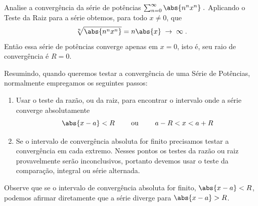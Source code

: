 \begin{example}
  Analise a convergência da série de potências
  \(
  	\sum_{n=0}^\infty \abs{n^n x^n}  \;.
 	\)
  \solution
  Aplicando o Teste da Raiz para a série obtemos, para todo $x\neq 0$, que
  \[
  	\sqrt[n]{\abs{n^nx^n}}=n\abs{x} \;\rightarrow\; \infty  \;.
 	\]
  Então essa série de potências converge apenas em $x=0$,
  isto é, seu raio de convergência é $R=0$.
\end{example}

Resumindo, quando queremos testar a convergência de uma Série de Potências,
normalmente empregamos os seguintes passos:
\begin{enumerate}[nosep]
  \item Usar o teste da razão, ou da raiz, para encontrar o intervalo onde
        a série converge absolutamente
        \[
          \abs{x-a} < R \qquad \text{ ou } \qquad a-R < x < a+R
        \]
  \item Se o intervalo de convergência absoluta for finito precisamos
        testar a convergência em cada extremo. Nesses pontos os testes
        da razão ou raiz provavelmente serão inconclusivos, portanto
        devemos usar o teste da comparação, integral ou série alternada.
\end{enumerate}
Observe que se o intervalo de convergência absoluta for finito, \(\abs{x-a} < R\),
podemos afirmar diretamente que a série diverge para \(\abs{x-a} > R\).

